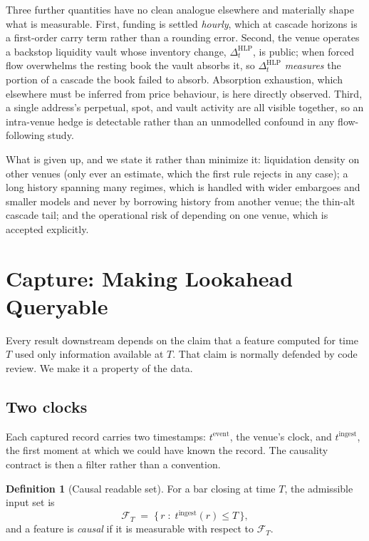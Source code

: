 \documentclass[11pt,a4paper]{article}
\theoremstyle{definition}
\newtheorem{definition}{Definition}[section]
\theoremstyle{plain}
\begin{document}
Three further quantities have no clean analogue elsewhere and materially shape what is measurable.
First, funding is settled \emph{hourly}, which at cascade horizons is a first-order carry term rather
than a rounding error. Second, the venue operates a backstop liquidity vault whose inventory change,
$\Delta_t^{\text{HLP}}$, is public; when forced flow overwhelms the resting book the vault absorbs
it, so $\Delta_t^{\text{HLP}}$ \emph{measures} the portion of a cascade the book failed to absorb.
Absorption exhaustion, which elsewhere must be inferred from price behaviour, is here directly
observed. Third, a single address's perpetual, spot, and vault activity are all visible together, so
an intra-venue hedge is detectable rather than an unmodelled confound in any flow-following study.

What is given up, and we state it rather than minimize it: liquidation density on other venues (only
ever an estimate, which the first rule rejects in any case); a long history spanning many regimes,
which is handled with wider embargoes and smaller models and never by borrowing history from another
venue; the thin-alt cascade tail; and the operational risk of depending on one venue, which is
accepted explicitly.

\section{Capture: Making Lookahead Queryable}
\label{sec:capture}

Every result downstream depends on the claim that a feature computed for time $T$ used only
information available at $T$. That claim is normally defended by code review. We make it a property
of the data.

\subsection{Two clocks}

Each captured record carries two timestamps: $t^{\text{event}}$, the venue's clock, and
$t^{\text{ingest}}$, the first moment at which we could have known the record. The causality
contract is then a filter rather than a convention.

\begin{definition}[Causal readable set]
\label{def:causal}
For a bar closing at time $T$, the admissible input set is
\[
  \mathcal{F}_T \;=\; \bigl\{\, r \;:\; t^{\text{ingest}}(r) \le T \,\bigr\},
\]
and a feature is \emph{causal} if it is measurable with respect to $\mathcal{F}_T$.
\end{definition}
\end{document}
